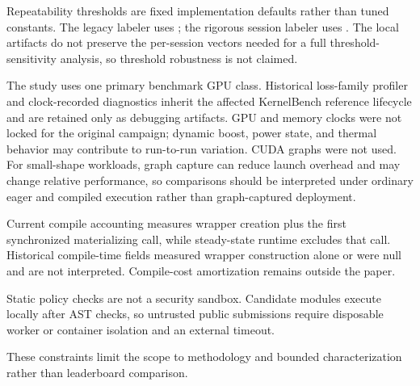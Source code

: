 Repeatability thresholds are fixed implementation defaults rather than tuned constants. The legacy labeler uses ; the rigorous session labeler uses . The local artifacts do not preserve the per-session vectors needed for a full threshold-sensitivity analysis, so threshold robustness is not claimed.

The study uses one primary benchmark GPU class. Historical loss-family profiler and clock-recorded diagnostics inherit the affected KernelBench reference lifecycle and are retained only as debugging artifacts. GPU and memory clocks were not locked for the original campaign; dynamic boost, power state, and thermal behavior may contribute to run-to-run variation. CUDA graphs were not used. For small-shape workloads, graph capture can reduce launch overhead and may change relative performance, so comparisons should be interpreted under ordinary eager and compiled execution rather than graph-captured deployment.

Current compile accounting measures wrapper creation plus the first synchronized materializing call, while steady-state runtime excludes that call. Historical compile-time fields measured wrapper construction alone or were null and are not interpreted. Compile-cost amortization remains outside the paper.

Static policy checks are not a security sandbox. Candidate modules execute locally after AST checks, so untrusted public submissions require disposable worker or container isolation and an external timeout.

These constraints limit the scope to methodology and bounded characterization rather than leaderboard comparison.
